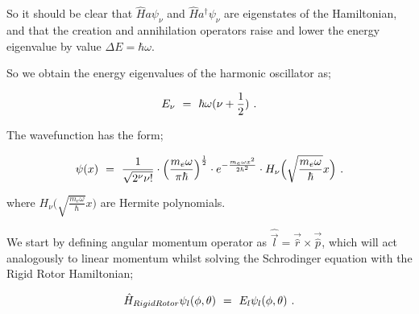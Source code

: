\documentclass{article}
\newcounter{subsubsubsection}[subsubsection]
\begin{document}
So it should be clear that \begin{math} \hat{H} a \psi_\nu \end{math} and  \begin{math} \hat{H} a^{\dagger} \psi_\nu \end{math} are eigenstates of the Hamiltonian, and that the creation and annihilation operators raise and lower the energy eigenvalue by value \begin{math} \Delta E = \hbar \omega \end{math}. 

So we obtain the energy eigenvalues of the harmonic oscillator as;

\begin{equation} \label{eb-eq-256-28}
E_\nu \hspace{0.125cm} = \hspace{0.125cm} \hbar \omega ( \nu + \frac{1}{2} ) \hspace{0.125cm} .
\end{equation}

The wavefunction has the form;

\begin{equation} \label{eb-eq-256-29}
\psi(x) \hspace{0.125cm} = \hspace{0.125cm} \frac{1}{\sqrt{2^{\nu} \nu !}}\cdot\Big( \frac{m_e \omega}{\pi \hbar} \Big)^{\frac{1}{2}}\cdot e^{-\frac{m_e \omega x^2}{2 \hbar^{2}}}\cdot H_{\nu}\Big(\sqrt{\frac{m_e \omega}{\hbar}} x \Big) \hspace{0.125cm} .
\end{equation}

where  \begin{math} H_{\nu}\Big(\sqrt{\frac{m_e \omega}{\hbar}} x \Big) \end{math} are Hermite polynomials. 

We start by defining angular momentum operator as \begin{math} \hat{\vec{l}} = \vec{\hat{r}}\times\vec{\hat{p}} \end{math}, which will act analogously to linear momentum whilst solving the Schrodinger equation with the Rigid Rotor Hamiltonian;

\begin{equation} \label{eb-eq-256-30}
\hat{H}_{RigidRotor} \psi_l(\phi, \theta) \hspace{0.125cm} = \hspace{0.125cm} E_l \psi_l(\phi, \theta)  \hspace{0.125cm} .
\end{equation}
\end{document}
